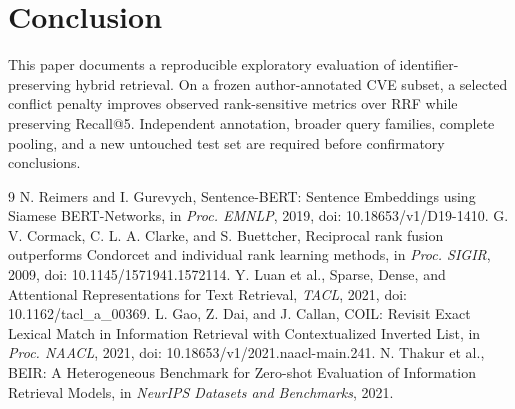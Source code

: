 \documentclass[conference]{IEEEtran}
\begin{document}
\section{Conclusion}
This paper documents a reproducible exploratory evaluation of identifier-preserving hybrid retrieval. On a frozen author-annotated CVE subset, a selected conflict penalty improves observed rank-sensitive metrics over RRF while preserving Recall@5. Independent annotation, broader query families, complete pooling, and a new untouched test set are required before confirmatory conclusions.

\begin{thebibliography}{9}
 N. Reimers and I. Gurevych, Sentence-BERT: Sentence Embeddings using Siamese BERT-Networks, in \emph{Proc. EMNLP}, 2019, doi: 10.18653/v1/D19-1410.
 G. V. Cormack, C. L. A. Clarke, and S. Buettcher, Reciprocal rank fusion outperforms Condorcet and individual rank learning methods, in \emph{Proc. SIGIR}, 2009, doi: 10.1145/1571941.1572114.
 Y. Luan et al., Sparse, Dense, and Attentional Representations for Text Retrieval, \emph{TACL}, 2021, doi: 10.1162/tacl\_a\_00369.
 L. Gao, Z. Dai, and J. Callan, COIL: Revisit Exact Lexical Match in Information Retrieval with Contextualized Inverted List, in \emph{Proc. NAACL}, 2021, doi: 10.18653/v1/2021.naacl-main.241.
 N. Thakur et al., BEIR: A Heterogeneous Benchmark for Zero-shot Evaluation of Information Retrieval Models, in \emph{NeurIPS Datasets and Benchmarks}, 2021.
\end{thebibliography}
\end{document}
